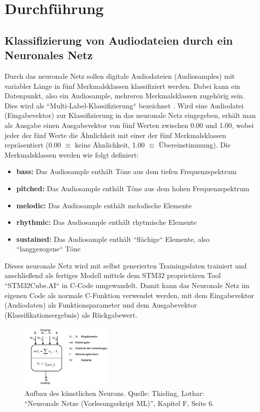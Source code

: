 \newpage
\section{Durchführung}

\subsection{Klassifizierung von Audiodateien durch ein Neuronales Netz}
Durch das neuronale Netz sollen digitale Audiodateien (Audiosamples) mit variabler Länge in fünf Merkmalsklassen klassifiziert werden. Dabei kann ein Datenpunkt, also ein Audiosample, mehreren Merkmalsklassen zugehörig sein. Dies wird als ``Multi-Label-Klassifizierung`` bezeichnet \cite{multilabel-classification}. Wird eine Audiodatei (Eingabevektor) zur Klassifizierung in das neuronale Netz eingegeben, erhält man als Ausgabe einen Ausgabevektor von fünf Werten zwischen 0.00 und 1.00, wobei jeder der fünf Werte  die Ähnlichkeit mit einer der fünf Merkmalsklassen repräsentiert (0.00 $\equiv$ keine Ähnlichkeit, 1.00 $\equiv$ Übereinstimmung). Die Merkmalsklassen werden wie folgt definiert:
    \begin{itemize}
        \item \textbf{bass:} Das Audiosample enthält Töne aus dem tiefen Frequenzspektrum
       	\item \textbf{pitched:} Das Audiosample enthält Töne aus dem hohen Frequenzspektrum
        \item \textbf{melodic:} Das Audiosample enthält melodische Elemente
        \item \textbf{rhythmic:} Das Audiosample enthält rhytmische Elemente
        \item \textbf{sustained:} Das Audiosample enthält ``flächige`` Elemente, also ``langgezogene`` Töne
    \end{itemize}

Dieses neuronale Netz wird mit selbst generierten Trainingsdaten trainiert und anschließend als fertiges Modell mittels dem STM32 proprietären Tool ``STM32Cube.AI`` in C-Code umgewandelt. Damit kann das Neuronale Netz im eigenen Code als normale C-Funktion verwendet werden, mit dem Eingabevektor (Audiodaten) als Funktionsparameter und dem Ausgabevektor (Klassifikationsergebnis) als Rückgabewert. \cite{stm32-cube-ai-documentation}

\begin{figure}
    \centering
    \includegraphics[width=0.4\textwidth]{images/08_durchfuehrung/neuron-aufbau.png}
    \caption{Aufbau des künstlichen Neurons. Quelle: Thieling, Lothar: “Neuronale Netze (Vorlesungsskript ML)”, Kapitel F, Seite 6.}
    \label{fig:img-aufbau-neuron}
\end{figure}

